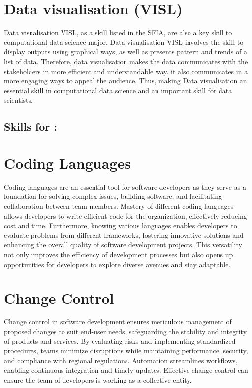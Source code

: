 \documentclass[a4paper, 11pt]{report}
\begin{document}
\section*{\textbf{Data visualisation (VISL)}}
Data visualisation VISL, as a skill listed in the SFIA, are also a key skill to computational data science major. Data visualisation VISL involves the skill to display outputs using graphical ways, as well as presents pattern and trends of a list of data. Therefore, data visualisation makes the data communicates with the stakeholders in more efficient and understandable way. it also communicates in a more engaging ways to appeal the audience. Thus, making Data visualisation an essential skill in computational data science and an important skill for data scientists. 



\subsection{Skills for \majC: \studC}

\section*{\textbf{Coding Languages}}
Coding languages are an essential tool for software developers as they serve as a foundation for solving complex issues, building software, and facilitating collaboration between team members. Mastery of different coding languages allows developers to write efficient code for the organization, effectively reducing cost and time. Furthermore, knowing various languages enables developers to evaluate problems from different frameworks, fostering innovative solutions and enhancing the overall quality of software development projects. This versatility not only improves the efficiency of development processes but also opens up opportunities for developers to explore diverse avenues and stay adaptable.

\section*{\textbf{Change Control}}
Change control in software development ensures meticulous management of proposed changes to suit end-user needs, safeguarding the stability and integrity of products and services. By evaluating risks and implementing standardized procedures, teams minimize disruptions while maintaining performance, security, and compliance with regional regulations. Automation streamlines workflows, enabling continuous integration and timely updates. Effective change control can ensure the team of developers is working as a collective entity.
\end{document}
